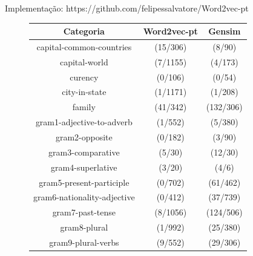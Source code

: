 \documentclass{beamer}
\begin{document}
\begin{frame}[fragile]{Implementação: https://github.com/felipessalvatore/Word2vec-pt}
\small{
\begin{figure}
\begin{center}
\begin{tabular}{|c|c|c|}
\hline
\cellcolor{blue!40}Categoria & \cellcolor{blue!40}Word2vec-pt & \cellcolor{blue!40}Gensim  \\ \hline
\cellcolor{blue!10}capital-common-countries & \cellcolor{green!10}(15/306) &  \cellcolor{green!10}(8/90) \\ \hline
\cellcolor{blue!10}capital-world &  \cellcolor{green!10}(7/1155) & \cellcolor{green!10} (4/173) \\ \hline
\cellcolor{blue!10}curency & \cellcolor{green!10} (0/106) &  \cellcolor{green!10}(0/54) \\ \hline
\cellcolor{blue!10}city-in-state & \cellcolor{green!10} (1/1171) &  \cellcolor{green!10}(1/208) \\ \hline
\cellcolor{blue!10}family &  \cellcolor{red!10}(41/342) & \cellcolor{red!10}(132/306) \\ \hline
\cellcolor{blue!10}gram1-adjective-to-adverb &  \cellcolor{red!10}(1/552) & \cellcolor{red!10}(5/380)  \\ \hline
\cellcolor{blue!10}gram2-opposite &  \cellcolor{red!10}(0/182) &\cellcolor{red!10}(3/90) \\ \hline
\cellcolor{blue!10}gram3-comparative &  \cellcolor{red!10}(5/30) & \cellcolor{red!10}(12/30) \\ \hline
\cellcolor{blue!10}gram4-superlative &  \cellcolor{red!10}(3/20) & \cellcolor{red!10}(4/6) \\ \hline
\cellcolor{blue!10}gram5-present-participle & \cellcolor{red!10} (0/702) & \cellcolor{red!10}(61/462) \\ \hline
\cellcolor{blue!10}gram6-nationality-adjective & \cellcolor{red!10}(0/412) & \cellcolor{red!10}(37/739) \\ \hline
\cellcolor{blue!10}gram7-past-tense &  \cellcolor{red!10}(8/1056) & \cellcolor{red!10}(124/506) \\ \hline
\cellcolor{blue!10}gram8-plural & \cellcolor{red!10} (1/992) &\cellcolor{red!10} (25/380) \\ \hline
\cellcolor{blue!10}gram9-plural-verbs &  \cellcolor{red!10}(9/552) & \cellcolor{red!10}(29/306)
\end{tabular}
\end{center}
\end{figure}
}
\end{frame}
\end{document}
